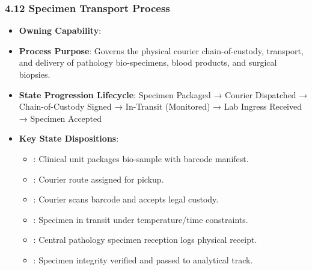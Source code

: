 \par\smallskip
{}\label{rad:processes:248}
\subsubsection*{4.12 Specimen Transport Process}
\label{rad:processes:249}

\begin{itemize}

\item
\textbf{Owning Capability}: \texttt{}



\item
\textbf{Process Purpose}: Governs the physical courier chain-of-custody, transport, and delivery of pathology bio-specimens, blood products, and surgical biopsies.



\item
\textbf{State Progression Lifecycle}: Specimen Packaged → Courier Dispatched → Chain-of-Custody Signed → In-Transit (Monitored) → Lab Ingress Received → Specimen Accepted



\item
\textbf{Key State Dispositions}:


\begin{itemize}

\item
\texttt{}: Clinical unit packages bio-sample with barcode manifest.



\item
\texttt{}: Courier route assigned for pickup.



\item
\texttt{}: Courier scans barcode and accepts legal custody.



\item
\texttt{}: Specimen in transit under temperature/\allowbreak{}time constraints.



\item
\texttt{}: Central pathology specimen reception logs physical receipt.



\item
\texttt{}: Specimen integrity verified and passed to analytical track.



\end{itemize}


\end{itemize}
\label{rad:processes:261}

